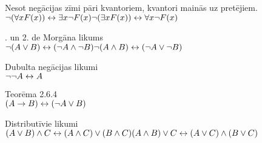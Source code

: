 \documentclass[12pt]{article}
\begin{document}
\noindent
Nesot negācijas zīmi pāri kvantoriem, kvantori mainās uz pretējiem.\\
$\neg(\forall x F(x)) \leftrightarrow \exists x\neg F(x)\\
\neg(\exists x F(x)) \leftrightarrow \forall x\neg F(x)\\
$

. un 2. de Morgāna likums\\
$\neg(A \lor B) \leftrightarrow (\neg A \land \neg B)\\
\neg(A \land B) \leftrightarrow (\neg A \lor \neg B)\\
$

\noindent
Dubulta negācijas likumi\\
$\neg\neg A \leftrightarrow A\\
$

\noindent
Teorēma 2.6.4\\
$(A \rightarrow B ) \leftrightarrow (\neg A \lor B )\\
$

\noindent
Distributīvie likumi\\
$(A \lor B) \land C \leftrightarrow (A \land C) \lor (B \land C) \\
(A \land B) \lor C \leftrightarrow (A \lor C) \land (B \lor C) \\
$
\end{document}
